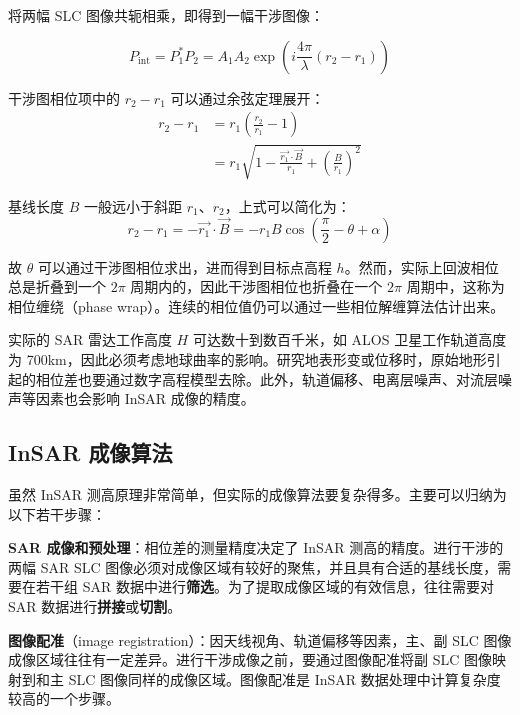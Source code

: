 将两幅 SLC 图像共轭相乘，即得到一幅干涉图像：

\begin{equation}
    P_{\textrm{int}} = P_1^* P_2 =  A_1 A_2 \exp(i \frac{4\pi}{\lambda}(r_2 - r_1))
\end{equation}

干涉图相位项中的 $ r_2 - r_1 $ 可以通过余弦定理展开：
\begin{equation}
\begin{split}
    r_2 - r_1 &= r_1 (\frac{r_2}{r_1} - 1) \\
              &= r_1 \sqrt{1- \frac{\vec{r_1} \cdot \vec{B}}{r_1} + (\frac{B}{r_1})^2}
\end{split}
\end{equation}

基线长度 $B$ 一般远小于斜距 $r_1$、$r_2$，上式可以简化为：
\begin{equation}
    r_2 - r_1 = - \vec{r_1} \cdot \vec{B} = - r_1 B \cos(\frac{\pi}{2} - \theta + \alpha)
\end{equation}

故 $\theta$ 可以通过干涉图相位求出，进而得到目标点高程 $h$。然而，实际上回波相位总是折叠到一个 $2\pi$ 周期内的，因此干涉图相位也折叠在一个 $2\pi$ 周期中，这称为相位缠绕（phase wrap）。连续的相位值仍可以通过一些相位解缠算法估计出来。

实际的 SAR 雷达工作高度 $H$ 可达数十到数百千米，如 ALOS 卫星工作轨道高度为 700km，因此必须考虑地球曲率的影响。研究地表形变或位移时，原始地形引起的相位差也要通过数字高程模型去除。此外，轨道偏移、电离层噪声、对流层噪声等因素也会影响 InSAR 成像的精度。

\subsection{InSAR 成像算法}

虽然 InSAR 测高原理非常简单，但实际的成像算法要复杂得多。主要可以归纳为以下若干步骤：

\textbf{SAR 成像和预处理}：相位差的测量精度决定了 InSAR 测高的精度。进行干涉的两幅 SAR SLC 图像必须对成像区域有较好的聚焦，并且具有合适的基线长度，需要在若干组 SAR 数据中进行\textbf{筛选}。为了提取成像区域的有效信息，往往需要对 SAR 数据进行\textbf{拼接}或\textbf{切割}。

\textbf{图像配准}（image registration）：因天线视角、轨道偏移等因素，主、副 SLC 图像成像区域往往有一定差异。进行干涉成像之前，要通过图像配准将副 SLC 图像映射到和主 SLC 图像同样的成像区域。图像配准是 InSAR 数据处理中计算复杂度较高的一个步骤。

